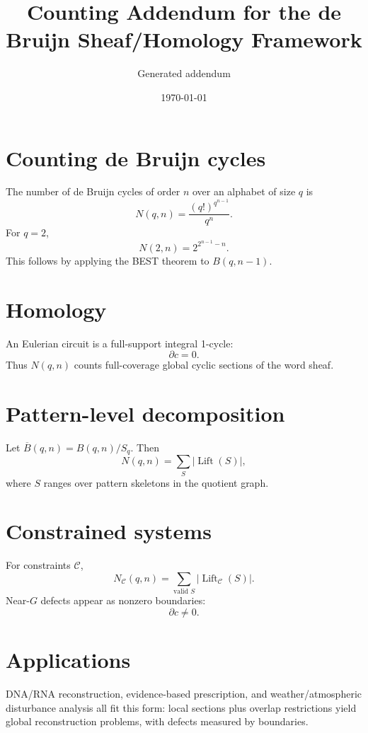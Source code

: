 \documentclass[11pt]{article}
\title{Counting Addendum for the de Bruijn Sheaf/Homology Framework}
\author{Generated addendum}
\date{\today}
\begin{document}
\maketitle

\section{Counting de Bruijn cycles}

The number of de Bruijn cycles of order \(n\) over an alphabet of size \(q\) is
\[
N(q,n)=\frac{(q!)^{q^{n-1}}}{q^n}.
\]
For \(q=2\),
\[
N(2,n)=2^{2^{n-1}-n}.
\]
This follows by applying the BEST theorem to \(B(q,n-1)\).

\section{Homology}

An Eulerian circuit is a full-support integral 1-cycle:
\[
\partial c=0.
\]
Thus \(N(q,n)\) counts full-coverage global cyclic sections of the word sheaf.

\section{Pattern-level decomposition}

Let \(\overline B(q,n)=B(q,n)/S_q\). Then
\[
N(q,n)=\sum_S |\operatorname{Lift}(S)|,
\]
where \(S\) ranges over pattern skeletons in the quotient graph.

\section{Constrained systems}

For constraints \(\mathcal C\),
\[
N_{\mathcal C}(q,n)
=
\sum_{\text{valid }S}
|\operatorname{Lift}_{\mathcal C}(S)|.
\]
Near-\(G\) defects appear as nonzero boundaries:
\[
\partial c\neq0.
\]

\section{Applications}

DNA/RNA reconstruction, evidence-based prescription, and weather/atmospheric disturbance analysis all fit this form: local sections plus overlap restrictions yield global reconstruction problems, with defects measured by boundaries.
\end{document}
